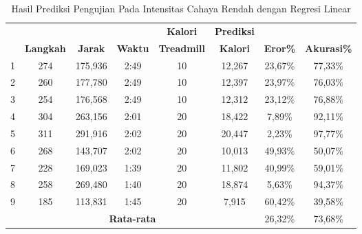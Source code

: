 \begin{longtable}{|c|c|c|c|c|c|c|c|}
  \caption{Hasil Prediksi Pengujian Pada Intensitas Cahaya Rendah dengan Regresi Linear}
  \label{tb:PengujianIntensitasRendahAnalisaPrediksiRegresi}                                   \\
  \hline
  \rowcolor[HTML]{C0C0C0}
  & & & & \textbf{Kalori} & \textbf{Prediksi} & & \\
  \rowcolor[HTML]{C0C0C0}
  \multirow{-2}{*}{\textbf{Percobaan}} & \multirow{-2}{*}{\textbf{Langkah}} & \multirow{-2}{*}{\textbf{Jarak}} & \multirow{-2}{*}{\textbf{Waktu}} & \textbf{Treadmill} & \textbf{Kalori} & \multirow{-2}{*}{\textbf{Eror\%}} & \multirow{-2}{*}{\textbf{Akurasi\%}} \\
  
  \hline
  1   & 274   & 175,936    & 2:49    & 10    & 12,267   & 23,67\%    & 77,33\%   \\
  \hline  
  2   & 260   & 177,780    & 2:49    & 10    & 12,397   & 23,97\%    & 76,03\%  \\
  \hline
  3   & 254   & 176,568    & 2:49    & 10    & 12,312   & 23,12\%    & 76,88\%   \\
  \hline
  4   & 304   & 263,156    & 2:01    & 20    & 18,422   & 7,89\%     & 92,11\%  \\
  \hline
  5   & 311   & 291,916    & 2:02    & 20    & 20,447   & 2,23\%     & 97,77\%    \\
  \hline
  6   & 268   & 143,707    & 2:02    & 20    & 10,013   & 49,93\%    & 50,07\%   \\
  \hline
  7   & 228   & 169,023    & 1:39    & 20    & 11,802   & 40,99\%    & 59,01\%   \\
  \hline
  8   & 258   & 269,480    & 1:40    & 20    & 18,874   & 5,63\%     & 94,37\%   \\
  \hline
  9   & 185   & 113,831    & 1:45    & 20    & 7,915    & 60,42\%    & 39,58\%   \\
  \hline

  \multicolumn{6}{|c|}{\textbf{Rata-rata}} & 26,32\% & 73,68\% \\
  \hline
\end{longtable}

